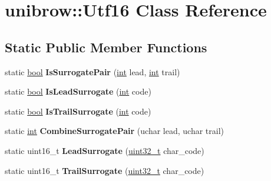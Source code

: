 \hypertarget{classunibrow_1_1Utf16}{}\section{unibrow\+:\+:Utf16 Class Reference}
\label{classunibrow_1_1Utf16}
\subsection*{Static Public Member Functions}
\begin{DoxyCompactItemize}
\item 
\mbox{\label{classunibrow_1_1Utf16_a8ab0761452dd5c57d5a90c6af999b5d7}} 
static \mbox{\hyperlink{classbool}{bool}} {\bfseries Is\+Surrogate\+Pair} (\mbox{\hyperlink{classint}{int}} lead, \mbox{\hyperlink{classint}{int}} trail)
\item 
\mbox{\label{classunibrow_1_1Utf16_ada29066756f075feb4786ec1b6d50f71}} 
static \mbox{\hyperlink{classbool}{bool}} {\bfseries Is\+Lead\+Surrogate} (\mbox{\hyperlink{classint}{int}} code)
\item 
\mbox{\label{classunibrow_1_1Utf16_abb3a01f7302f952deaad31b667fd83a8}} 
static \mbox{\hyperlink{classbool}{bool}} {\bfseries Is\+Trail\+Surrogate} (\mbox{\hyperlink{classint}{int}} code)
\item 
\mbox{\label{classunibrow_1_1Utf16_aac66a94947867b52f783c206f7f798ac}} 
static \mbox{\hyperlink{classint}{int}} {\bfseries Combine\+Surrogate\+Pair} (uchar lead, uchar trail)
\item 
\mbox{\label{classunibrow_1_1Utf16_a01bbf2bab943780510481b14565039b5}} 
static uint16\+\_\+t {\bfseries Lead\+Surrogate} (\mbox{\hyperlink{classuint32__t}{uint32\+\_\+t}} char\+\_\+code)
\item 
\mbox{\label{classunibrow_1_1Utf16_a867f66dde6dfd10126ed5dc997caee32}} 
static uint16\+\_\+t {\bfseries Trail\+Surrogate} (\mbox{\hyperlink{classuint32__t}{uint32\+\_\+t}} char\+\_\+code)
\end{DoxyCompactItemize}

